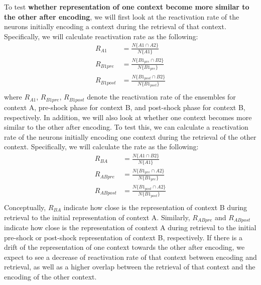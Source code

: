 \documentclass[master.tex]{subfiles}
\begin{document}
To test \textbf{whether representation of one context become more similar to the
  other after encoding}, we will first look at the reactivation rate of the
neurons initially encoding a context during the retrieval of that context.
Specifically, we will calculate reactivation rate as the following:
\begin{align*}
  R_{A1} & = \frac{N\{A1 \cap A2\}}{N\{A1\}} \\
  R_{B1pre} & = \frac{N\{B1_{pre} \cap B2\}}{N\{B1_{pre}\}} \\
  R_{B1post} & = \frac{N\{B1_{post} \cap B2\}}{N\{B1_{post}\}} \\
\end{align*}
where $R_{A1}$, $R_{B1pre}$, $R_{B1post}$ denote the reactivation rate of the
ensembles for context A, pre-shock phase for context B, and post-shock phase for
context B, respectively. In addition, we will also look at whether one context
becomes more similar to the other after encoding. To test this, we can calculate
a reactivation rate of the neurons initially encoding one context during the
retrieval of the other context. Specifically, we will calculate the rate as the
following:
\begin{align*}
  R_{BA} & = \frac{N\{A1 \cap B2\}}{N\{A1\}} \\
  R_{ABpre} & = \frac{N\{B1_{pre} \cap A2\}}{N\{B1_{pre}\}} \\
  R_{ABpost} & = \frac{N\{B1_{post} \cap A2\}}{N\{B1_{post}\}} \\
\end{align*}
Conceptually, $R_{BA}$ indicate how close is the representation of context B
during retrieval to the initial representation of context A. Similarly,
$R_{ABpre}$ and $R_{ABpost}$indicate how close is the representation of context
A during retrieval to the initial pre-shock or post-shock representation of
context B, respectively. If there is a drift of the representation of one
context towards the other after encoding, we expect to see a decrease of
reactivation rate of that context between encoding and retrieval, as well as a
higher overlap between the retrieval of that context and the encoding of the
other context.
\end{document}
